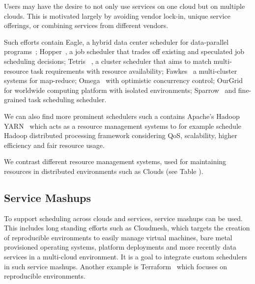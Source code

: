 \documentclass[final,5p,times,twocolumn]{elsarticle}
\begin{document}
Users may have the desire to not only use services on one cloud but on
multiple clouds. This is motivated largely by avoiding vendor lock-in,
unique service offerings, or combining services from different
vendors.



Such efforts contain Eagle, a hybrid data center scheduler for
data-parallel programs~\cite{delgado2016job};
Hopper~\cite{ren2015hopper}, a job scheduler that trades off existing
and speculated job scheduling decisions; Tetris
~\cite{grandl2015multi}, a cluster scheduler that aims to match
multi-resource task requirements with resource availability;
Fawkes~\cite{ghit2014balanced} a multi-cluster systems for map-reduce;
Omega~\cite{schwarzkopf2013omega} with optimistic concurrency control;
OurGrid~\cite{andrade2003ourgrid,cirne2006labs} for worldwide
computing platform with isolated environments;
Sparrow~\cite{ousterhout2013sparrow} and fine-grained task scheduling
scheduler.
  
We can also find more prominent schedulers such a contains Apache's
  Hadoop YARN~\cite{vavilapalli2013apache} which acts as a resource
  management systems to for example schedule Hadoop distributed
  processing framework considering QoS, scalability, higher efficiency
  and fair resource usage.

We contrast different resource management systems, used for
maintaining resources in distributed environments such as Clouds (see
Table \label{T:distr-cloud}).

\subsection{Service Mashups} 
\label{sec:mesh}

To support scheduling across clouds and services, service mashups can
be used. This includes long standing efforts such as Cloudmesh, which
targets the creation of reproducible environments to easily manage
virtual machines, bare metal provisioned operating systems, platform
deployments and more recently data services in a multi-cloud
environment. It is a goal to integrate custom schedulers in such
service mashups. Another example is Terraform~\cite{www-terraform}
which focuses on reproducible environments.




\end{document}
